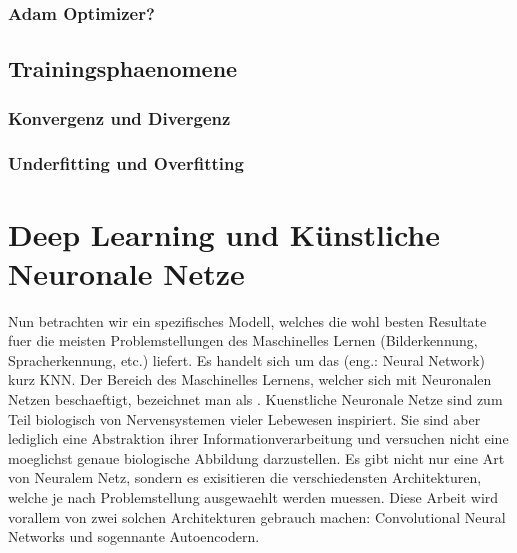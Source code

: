 \subsection{Adam Optimizer?}

\section{Trainingsphaenomene}

\subsection{Konvergenz und Divergenz}
\subsection{Underfitting und Overfitting}


\chapter{Deep Learning und Künstliche Neuronale Netze}
Nun betrachten wir ein spezifisches Modell, welches die wohl besten Resultate
fuer die meisten Problemstellungen des Maschinelles Lernen (Bilderkennung,
Spracherkennung, etc.) liefert. Es handelt sich um das  (eng.: Neural Network) kurz KNN.
Der Bereich des Maschinelles Lernens, welcher sich mit Neuronalen Netzen
beschaeftigt, bezeichnet man als .
\para{}
Kuenstliche Neuronale Netze sind zum Teil biologisch von Nervensystemen vieler
Lebewesen inspiriert.
Sie sind aber lediglich eine Abstraktion ihrer Informationverarbeitung und versuchen nicht eine moeglichst genaue biologische Abbildung darzustellen.
Es gibt nicht nur eine Art von Neuralem Netz, sondern es exisitieren die
verschiedensten Architekturen, welche je nach Problemstellung ausgewaehlt werden
muessen. Diese Arbeit wird vorallem von zwei solchen Architekturen gebrauch machen:
Convolutional Neural Networks und sogennante Autoencodern.

